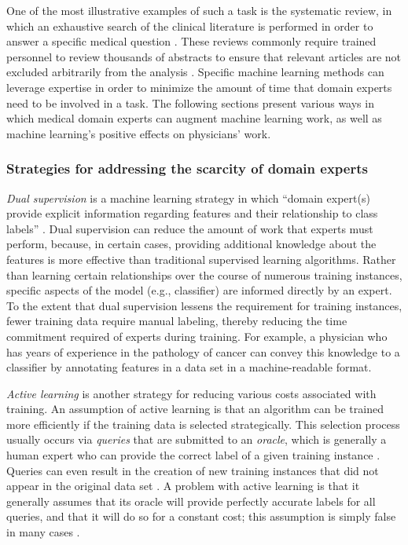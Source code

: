 \documentclass[12pt]{article} %
\begin{document}
One of the most illustrative examples of such a task is the systematic review, in which an exhaustive search of the clinical literature is performed in order to answer a specific medical question \cite{counsell1997}. These reviews commonly require trained personnel to review thousands of abstracts to ensure that relevant articles are not excluded arbitrarily from the analysis \cite{wallace2012}. Specific machine learning methods can leverage expertise in order to minimize the amount of time that domain experts need to be involved in a task. The following sections present various ways in which medical domain experts can augment machine learning work, as well as machine learning's positive effects on physicians' work.


\subsubsection{Strategies for addressing the scarcity of domain experts}
\textit{Dual supervision} is a machine learning strategy in which ``domain expert(s) provide explicit information regarding features and their relationship to class labels'' \cite{wallace2012}.
Dual supervision can reduce the amount of work that experts must perform, because, in certain cases, providing additional knowledge about the features is more effective than traditional supervised learning algorithms.
Rather than learning certain relationships over the course of numerous training instances, specific aspects of the model (e.g., classifier) are informed directly by an expert.
To the extent that dual supervision lessens the requirement for training instances, fewer training data require manual labeling, thereby reducing the time commitment required of experts during training. For example, a physician who has years of experience in the pathology of cancer can convey this knowledge to a classifier by annotating features in a data set in a machine-readable format.

\textit{Active learning} is another strategy for reducing various costs associated with training.
An assumption of active learning is that an algorithm can be trained more efficiently if the training data is selected strategically.
This selection process usually occurs via \textit{queries} that are submitted to an \textit{oracle}, which is generally a human expert who can provide the correct label of a given training instance \cite{settles2009}.
Queries can even result in the creation of new training instances that did not appear in the original data set \cite{angluin1987}.
A problem with active learning is that it generally assumes that its oracle will provide perfectly accurate labels for all queries, and that it will do so for a constant cost; this assumption is simply false in many cases \cite{wallace2012}.
\end{document}
